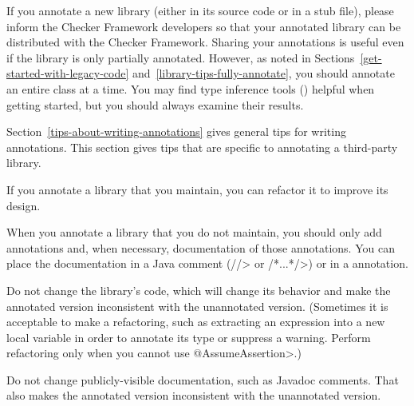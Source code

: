 If you annotate a new library (either in its source code or in a stub
file), please inform the Checker Framework
developers so that your annotated library can be distributed with the
Checker Framework.
Sharing your annotations is useful even if the library is only partially
annotated.
However, as noted in Sections~\ref{get-started-with-legacy-code} and~\ref{library-tips-fully-annotate}, you
should annotate an entire class at a time.
You may find type inference tools () helpful
when getting started, but you should always examine their results.



Section~\ref{tips-about-writing-annotations} gives general tips for writing
annotations.  This section gives tips that are specific to annotating a
third-party library.



If you annotate a library that you maintain, you can refactor it to improve
its design.

When you annotate a library that you do not maintain, you should only add
annotations and, when necessary, documentation of those annotations.  You
can place the documentation in a Java comment (\<//> or \</*...*/>) or in a
 annotation.

Do not change the library's code, which will change its behavior and make
the annotated version inconsistent with the unannotated version.
(Sometimes it is acceptable to make a refactoring, such as extracting an
expression into a new local variable in order to annotate its type or
suppress a warning.  Perform refactoring only when you cannot use
\<@AssumeAssertion>.)

Do not change publicly-visible documentation, such as Javadoc comments.
That also makes the annotated version inconsistent with the unannotated
version.


